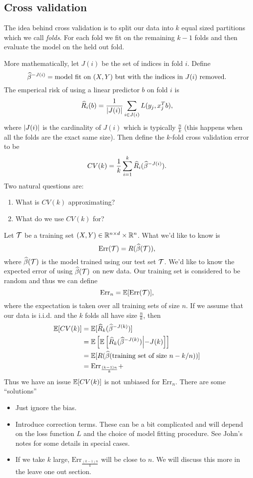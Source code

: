 \subsection{Cross validation}
The idea behind cross validation is to split our data into $k$ equal sized partitions which we call \emph{folds}. For each fold we fit on the remaining $k-1$ folds and then evaluate the model on the held out fold. 

More mathematically, let $J(i)$ be the set of indices in fold $i$. Define
\[\widehat{\beta}^{-J(i)} = \text{model fit on $(X,Y)$ but with the indices in $J(i)$ removed.}\]
The emperical risk of using a linear predictor $b$ on fold $i$ is
\[\widehat{R}_i(b) =\frac{1}{{\left\lvert J(i)\right\rvert}}\sum_{i \in J(i)} L(y_j, x_j^Tb),\]
where ${\left\lvert J(i)\right\rvert}$ is the cardinality of $J(i)$ which is typically $\frac{n}{k}$ (this happens when all the folds are the exact same size). Then define the $k$-fold cross validation error to be
\[CV(k) = \frac{1}{k} \sum_{i=1}^k \widehat{R}_i(\widehat{\beta}^{-J(i)}). \]
Two natural questions are:
\begin{enumerate}
    \item What is $CV(k)$ approximating?
    \item What do we use $CV(k)$ for?
\end{enumerate}
Let ${\mathcal{T}}$ be a training set $(X,Y) \in {\mathbb R}^{n \times d} \times {\mathbb R}^n$. What we'd like to know is
\[\text{Err}({\mathcal{T}}) = R(\widehat{\beta}({\mathcal{T}})),\]
where $\widehat{\beta}({\mathcal{T}})$ is the model trained using our test set ${\mathcal{T}}$. We'd like to know the expected error of using $\widehat{\beta}({\mathcal{T}})$ on new data. Our training set is considered to be random and thus we can define
\[ \text{Err}_n = {\mathbb{E}}[\text{Err}({\mathcal{T}})],\]
where the expectation is taken over all training sets of size $n$. If we assume that our data is i.i.d. and the $k$ folds all have size $\frac{n}{k}$, then
\begin{align*}
    {\mathbb{E}}[CV(k)]&={\mathbb{E}}[\widehat{R}_k(\widehat{\beta}^{-J(k)})]\\
    &={\mathbb{E}}\left[{\mathbb{E}}\left[\widehat{R}_k(\widehat{\beta}^{-J(k)})\middle|-J(k)\right] \right]\\
    &={\mathbb{E}}[R(\widehat{\beta}(\text{training set of size } n-k/n))]\\
    &=\text{Err}_{\frac{(k-1)n}{k}}+
\end{align*}
Thus we have an issue ${\mathbb{E}}[CV(k)]$ is not unbiased for $\text{Err}_n$. There are some ``solutions''
\begin{itemize}
    \item Just ignore the bias.
    \item Introduce correction terms. These can be a bit complicated and will depend on the loss function $L$ and the choice of model fitting procedure. See John's notes for some details in special cases.
    \item If we take $k$ large, $\text{Err}_{\frac{(k-1)n}{k}}$ will be close to $n$. We will discuss this more in the leave one out section.
\end{itemize}
